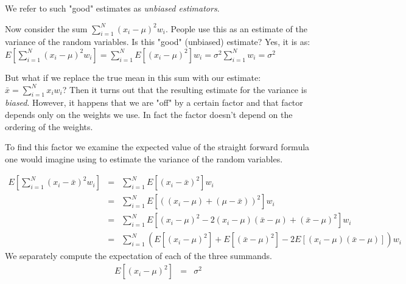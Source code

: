 \documentclass{article}
\begin{document}
We refer to such "good" estimates as {\em unbiased estimators\/}.

Now consider the sum $\sum_{i=1}^N (x_i - \mu)^2 w_i$.
People use this as an estimate of the variance of the random variables. Is this "good" (unbiased) estimate?
Yes, it is as: $E\left[ \sum_{i=1}^N (x_i - \mu)^2 w_i \right] = \sum_{i=1}^N E[(x_i- \mu)^2] w_i = \sigma^2 \sum_{i=1}^N w_i = \sigma^2$

But what if we replace the true mean in this sum with our estimate: ${\bar x} = \sum_{i=1}^N x_i w_i$?
Then it turns out that the resulting estimate for the variance is {\em biased\/}.
However, it happens that we are "off" by a certain factor and that factor depends only on the weights 
we use. In fact the factor doesn't depend on the ordering of the weights.

To find this factor we examine the expected value of the straight forward formula one would imagine
using to estimate the variance of the random variables.

\begin{eqnarray}
    E\left[ \sum_{i=1}^N (x_i - {\bar x})^2 w_i \right] & = & \sum_{i=1}^N E\left[(x_i - {\bar x})^2\right] w_i \nonumber \\
    & = & \sum_{i=1}^N E\left[\left((x_i - \mu) + (\mu - {\bar x})\right)^2\right] w_i \nonumber \\
    & = & \sum_{i=1}^N E\left[(x_i - \mu)^2 - 2(x_i - \mu)({\bar x} - \mu ) + ({\bar x} - \mu)^2\right] w_i \nonumber \\
    & = & \sum_{i=1}^N \left( E\left[(x_i - \mu)^2\right] + E\left[ ({\bar x} - \mu)^2\right] 
              - 2E\left[(x_i - \mu) ({\bar x} - \mu) \right] \right) w_i \label{standard_emp_var}
\end{eqnarray}
We separately compute the expectation of each of the three summands.
\begin{eqnarray}
    E\left[(x_i - \mu)^2\right] & = & \sigma^2
\end{eqnarray}
\end{document}
